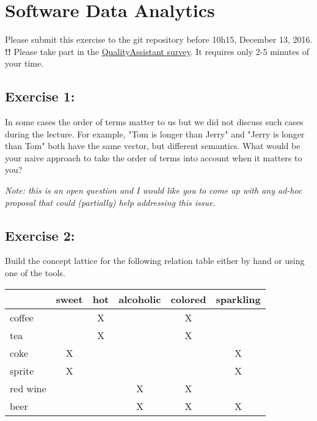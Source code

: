 \documentclass [11pt, a4wide, twoside]{article}
\begin{document}
\section*{Software Data Analytics}


Please submit this exercise to the git repository before 10h15, December 13, 2016.\\

\noindent
\textbf{\color{red}  !!} Please take part in the \href{http://rio.inf.usi.ch/survey/index.php/778353}{QualityAssistant survey}. It requires only 2-5 minutes of your time.

\subsection*{Exercise 1:}
In some cases the order of terms matter to us but we did not discuss such cases during the lecture. For example, "Tom is longer than Jerry" and "Jerry is longer than Tom" both have the same vector, but different semantics. 
What would be your naive approach to take the order of terms into account when it matters to you? 

\emph{Note: this is an open question and I would like you to come up with any ad-hoc proposal that could (partially) help addressing this issue.}

\subsection*{Exercise 2:}
Build the concept lattice for the following relation table either by hand or using one of the tools.

\begin{table}[h]
\centering
\label{my-label}
\begin{tabular}{lccccc}
         & sweet & hot & alcoholic & colored & sparkling \\ \hline
coffee   &       & X   &           & X       &           \\ \hline
tea      &       & X   &           & X       &           \\ \hline
coke     & X     &     &           &         & X         \\ \hline
sprite   & X     &     &           &         & X         \\ \hline
red wine &       &     & X         & X       &           \\ \hline
beer     &       &     & X         & X       & X         \\ \hline
\end{tabular}
\end{table}
\end{document}
